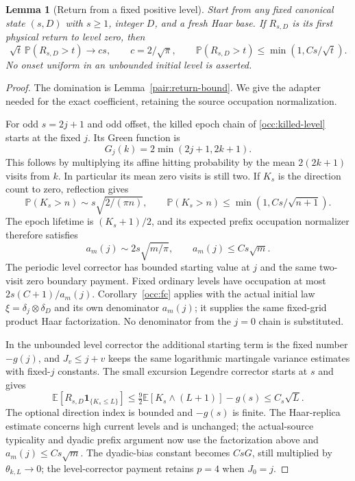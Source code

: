 \documentclass[11pt]{amsart}
\newtheorem{lemma}[theorem]{Lemma}
\theoremstyle{definition}
\theoremstyle{remark}
\begin{document}
\begin{lemma}[Return from a fixed positive level]\label{pair:fixed-return}\label{family:fixed-return}
Start from any fixed canonical state $(s,D)$ with $s\ge1$, integer
$D$, and a fresh Haar base. If $R_{s,D}$ is its first physical return to level zero, then
\[
 \sqrt t\,\mathbb P(R_{s,D}>t)\longrightarrow cs,
 \qquad c=2/\sqrt\pi,
 \qquad \mathbb P(R_{s,D}>t)\le\min(1,Cs/\sqrt t).
\]
No onset uniform in an unbounded initial level is asserted.
\end{lemma}
\begin{proof}
The domination is Lemma~\ref{pair:return-bound}. We give the
adapter needed for the exact coefficient, retaining
the source occupation normalization.

For odd $s=2j+1$ and odd offset, the killed epoch chain of
\eqref{occ:killed-level} starts at the fixed $j$. Its Green function is
\[
 G_j(k)=2\min(2j+1,2k+1).
\]
This follows by multiplying its affine hitting probability by the mean
$2(2k+1)$ visits from $k$. In particular its mean zero visits is still
two. If $K_s$ is the direction count to zero, reflection gives
\[
 \mathbb P(K_s>n)\sim s\sqrt{2/(\pi n)},\qquad
 \mathbb P(K_s>n)\le\min(1,Cs/\sqrt{n+1}).
\]
The epoch lifetime is $(K_s+1)/2$, and its expected prefix occupation
normalizer therefore satisfies
\[
 a_m(j)\sim2s\sqrt{m/\pi},\qquad a_m(j)\le Cs\sqrt m.
\]
The periodic level corrector has bounded starting value at $j$ and the
same two-visit zero boundary payment. Fixed ordinary levels have
occupation at most $2s(C+1)/a_m(j)$. Corollary~\ref{occ:fc} applies
with the actual initial law $\xi=\delta_j\otimes\delta_D$ and its
own denominator $a_m(j)$; it supplies the same fixed-grid product Haar
factorization. No denominator from the $j=0$ chain is substituted.

In the unbounded level corrector the additional starting term is the
fixed number $-g(j)$, and $J_v\le j+v$ keeps the same logarithmic
martingale variance estimates with fixed-$j$ constants. The small
excursion Legendre corrector starts at $s$ and gives
\[
 \mathbb E[R_{s,D}\mathbf1_{\{K_s\le L\}}]
 \le\tfrac92\mathbb E[K_s\wedge(L+1)]-g(s)
 \le C_s\sqrt L.
\]
The optional direction index is bounded and $-g(s)$ is finite. The
Haar-replica estimate concerns high current levels and is unchanged;
the actual-source typicality and dyadic prefix argument now use the
factorization above and $a_m(j)\le Cs\sqrt m$. The dyadic-bias
constant becomes $CsG$, still multiplied by $\theta_{k,L}\to0$;
the level-corrector payment retains $p=4$ when $J_0=j$.


\end{proof}
\end{document}
